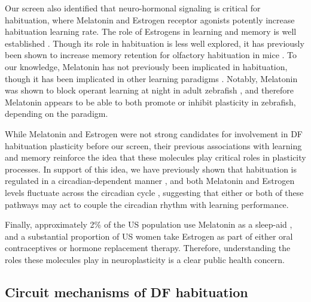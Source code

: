 \documentclass[9pt,lineno]{RandlettLab_elife}
\begin{document}
Our screen also identified that neuro-hormonal signaling is critical for habituation, where Melatonin and Estrogen receptor agonists potently increase habituation learning rate. The role of Estrogens in learning and memory is well established \citep{Luine1998-iz,Nilsson2002-fi}. Though its role in habituation is less well explored, it has previously been shown to increase memory retention for olfactory habituation in mice \citep{Dillon2013-ez}. To our knowledge, Melatonin has not previously been implicated in habituation, though it has been implicated in other learning paradigms \citep{El-Sherif2003-tv, Jilg2019-lq}. Notably, Melatonin was shown to block operant learning at night in adult zebrafish \citep{Rawashdeh2007-ts}, and therefore Melatonin appears to be able to both promote or inhibit plasticity in zebrafish, depending on the paradigm. 

While Melatonin and Estrogen were not strong candidates for involvement in DF habituation plasticity before our screen, their previous associations with learning and memory reinforce the idea that these molecules play critical roles in plasticity processes. In support of this idea, we have previously shown that habituation is regulated in a circadian-dependent manner \citep{Randlett2019-fi}, and both Melatonin and Estrogen levels fluctuate across the circadian cycle \citep{Alvord2022-ii, Gandhi2015-vw, Zhdanova2001-tk}, suggesting that either or both of these pathways may act to couple the circadian rhythm with learning performance. 

Finally, approximately 2\% of the US population use Melatonin as a sleep-aid \citep{Li2022-lu}, and a substantial proportion of US women take Estrogen as part of either oral contraceptives or hormone replacement therapy. Therefore, understanding the roles these molecules play in neuroplasticity is a clear public health concern. 

\subsection{Circuit mechanisms of DF habituation}
\end{document}
